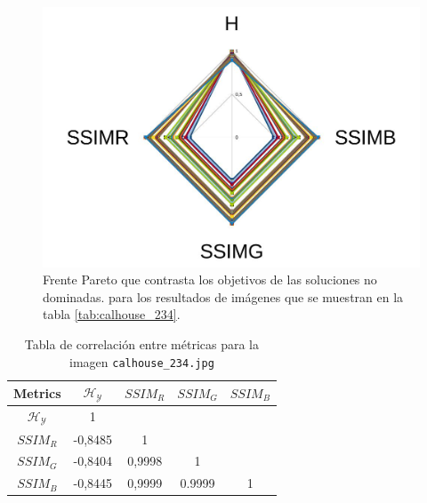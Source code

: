     \begin{figure}[H]
    \centering
    \includegraphics[width=\textwidth]{./Figures/calhouse_234/calhouse_234_2.jpg}
    \caption{Frente Pareto que contrasta los objetivos de las soluciones no dominadas. para los resultados de imágenes que se muestran en la tabla \ref{tab:calhouse_234}.}
    \label{fig:calhouse2342fp}
    \end{figure}

\begin{table}[H]
\setlength{\abovecaptionskip}{2pt plus 3pt minus 2pt} %
\caption[Parámetros de entrada para $MOPSO$]{Tabla de correlación entre métricas para la imagen \texttt{calhouse\_234.jpg}}
\begin{center}
 \begin{tabular}{||c | c c c c||} 
 \hline
Metrics & $\mathscr{H_Y}$ & $SSIM_R$ & $SSIM_G$ & $SSIM_B$ \\ 
\hline
$\mathscr{H_Y}$ & 1 &  &  & \\ 
\hline
$SSIM_R$ & -0,8485 & 1 &  \\ 
\hline
$SSIM_G$ & -0,8404 & 0,9998  & 1  & \\ 
\hline
$SSIM_B$ & -0,8445 & 0,9999  & 0.9999  & 1 \\ 
\hline
\end{tabular}
\end{center}
\label{table:correlacion}
\end{table}


